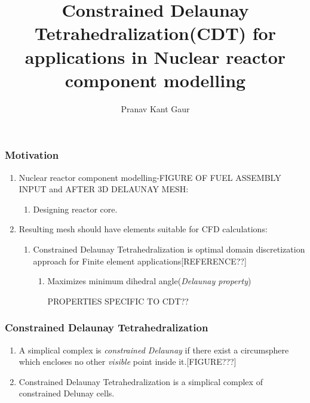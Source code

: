 \documentclass{beamer}
\title[CDT]{Constrained Delaunay Tetrahedralization(CDT) for applications in Nuclear reactor component modelling}
\author{Pranav Kant Gaur}
\institute[BARC, India]{Computer Division, \newline Bhabha Atomic Research Centre, Mumbai, India}
\date{}
\begin{document}
	\begin{frame}
		\titlepage
	\end{frame}	
	\begin{frame}
	\frametitle{Motivation}
		\begin{enumerate}
			\item Nuclear reactor component modelling-FIGURE OF FUEL ASSEMBLY INPUT and AFTER 3D DELAUNAY MESH:
				\begin{enumerate}
					\item Designing reactor core.	
				\end{enumerate}		
			\item Resulting mesh should have elements suitable for CFD calculations:
				\begin{enumerate}
					\item Constrained Delaunay Tetrahedralization is optimal domain discretization approach for Finite element applications[REFERENCE??]
						\begin{enumerate}
							\item Maximizes minimum dihedral angle(\textit{Delaunay property})
							\item [PROPERTIES SPECIFIC TO CDT??]	
						\end{enumerate}		
				\end{enumerate}		
		\end{enumerate}		
	\end{frame}
	\begin{frame}
		\frametitle{Constrained Delaunay Tetrahedralization}
		\begin{enumerate}
			\item A simplical complex is \textit{constrained Delaunay} if there exist a circumsphere which encloses no other \textit{visible} point inside it.[FIGURE???]
			\item Constrained Delaunay Tetrahedralization is a simplical complex of constrained Delunay cells.
		\end{enumerate}
	\end{frame}	
\end{document}
